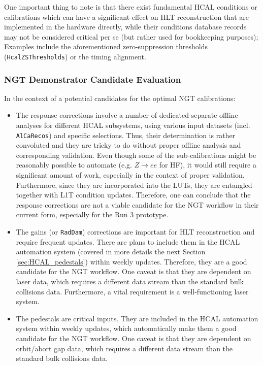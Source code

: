 One important thing to note is that there exist fundamental HCAL conditions or calibrations which can have a significant effect on HLT reconstruction that are implemented in the hardware directly,  while their conditions database records may not be considered critical per se (but rather used for bookkeeping purposes); Examples include the aforementioned zero-suppression thresholds (\texttt{HcalZSThresholds}) or the timing alignment.

\subsubsection{NGT Demonstrator Candidate Evaluation}
In the context of a potential candidates for the optimal NGT calibrations:
\begin{itemize}
    \item The response corrections involve a number of dedicated separate offline analyses for different HCAL subsystems, using various input datasets (incl. \texttt{AlCaRecos}) and specific selections. Thus, their determination is rather convoluted and they are tricky to do without proper offline analysis and corresponding validation. Even though some of the sub-calibrations might be reasonably possible to automate (e.g. $Z \rightarrow ee$ for HF), it would still require a significant amount of work, especially in the context of proper validation. Furthermore, since they are incorporated into the LUTs, they are entangled together with L1T condition updates. Therefore, one can conclude that the response corrections are not a viable candidate for the NGT workflow in their current form, especially for the Run 3 prototype.
    \item The gains (or \texttt{RadDam}) corrections are important for HLT reconstruction and require frequent updates. There are plans to include them in the HCAL automation system (covered in more details the next Section \ref{sec:HCAL_pedestals}) within weekly updates. Therefore, they are a good candidate for the NGT workflow. One caveat is that they are dependent on laser data, which requires a different data stream than the standard bulk collisions data. Furthermore, a vital requirement is a well-functioning laser system.
    \item The pedestals are critical inputs. They are included in the HCAL automation system within weekly updates, which automatically make them a good candidate for the NGT workflow. One caveat is that they are dependent on orbit/abort gap data, which requires a different data stream than the standard bulk collisions data.
\end{itemize}

